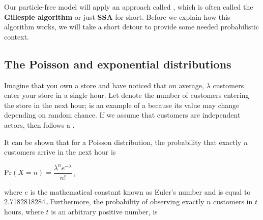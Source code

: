 \begin{note}\end{note}

Our particle-free model will apply an approach called , which is often called the \textbf{Gillespie algorithm} or just \textbf{SSA} for short. Before we explain how this algorithm works, we will take a short detour to provide some needed probabilistic context.

\FloatBarrier
{}
\subsection{The Poisson and exponential distributions}

Imagine that you own a store and have noticed that on average, $\lambda$ customers enter your store in a single hour. Let  denote the number of customers entering the store in the next hour;  is an example of a  because its value may change depending on random chance. If we assume that customers are independent actors, then  follows a .

It can be shown that for a Poisson distribution, the probability that exactly $n$ customers arrive in the next hour is

\begin{center}
$\mathrm{Pr}(X = n) = \dfrac{\lambda^n e^{-\lambda}}{n!}$\,,
\end{center}

\noindent where $e$ is the mathematical constant known as Euler's number and is equal to 2.7182818284\ldots Furthermore, the probability of observing exactly $n$ customers in $t$ hours, where $t$ is an arbitrary positive number, is

